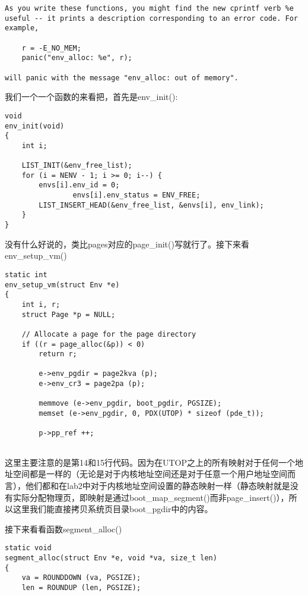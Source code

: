 \documentclass{article}
\newcommand{\funcname}[1]{{\ttfamily \small #1}}
\begin{document}
\begin{CJK*}{UTF8}{gkai}
\begin{lstlisting}[style=exercise]
As you write these functions, you might find the new cprintf verb %e useful -- it prints a description corresponding to an error code. For example,

	r = -E_NO_MEM;
	panic("env_alloc: %e", r);
	
will panic with the message "env_alloc: out of memory".
\end{lstlisting}

\vspace{4em}

我们一个一个函数的来看把，首先是\funcname{env\_init()}:

\begin{lstlisting}[style=ccode, title={\scriptsize \ttfamily \bfseries kern/env.c: env\_init ()}]
void
env_init(void)
{
	int i;

	LIST_INIT(&env_free_list);
	for (i = NENV - 1; i >= 0; i--) {
		envs[i].env_id = 0;
                envs[i].env_status = ENV_FREE; 
		LIST_INSERT_HEAD(&env_free_list, &envs[i], env_link);
	}
}
\end{lstlisting}

没有什么好说的，类比pages对应的\funcname{page\_init()}写就行了。接下来看 \funcname{ env\_setup\_vm() }

\begin{lstlisting}[style=ccode, title={\scriptsize \ttfamily \bfseries kern/env.c: env\_setup\_vm ()}]
static int
env_setup_vm(struct Env *e)
{
	int i, r;
	struct Page *p = NULL;

	// Allocate a page for the page directory
	if ((r = page_alloc(&p)) < 0)
		return r;
		
        e->env_pgdir = page2kva (p);
        e->env_cr3 = page2pa (p);

        memmove (e->env_pgdir, boot_pgdir, PGSIZE);
        memset (e->env_pgdir, 0, PDX(UTOP) * sizeof (pde_t));
   
        p->pp_ref ++;
    
\end{lstlisting}

这里主要注意的是第14和15行代码。因为在UTOP之上的所有映射对于任何一个地址空间都是一样的（无论是对于内核地址空间还是对于任意一个用户地址空间而言），他们都和在lab2中对于内核地址空间设置的静态映射一样（静态映射就是没有实际分配物理页，即映射是通过\funcname{boot\_map\_segment()}而非\funcname{page\_insert()}），所以这里我们能直接拷贝系统页目录boot\_pgdir中的内容。

接下来看看函数\funcname{segment\_alloc()}

\begin{lstlisting}[style=ccode, title={\scriptsize \ttfamily \bfseries kern/env.c: segment\_alloc ()}]
static void
segment_alloc(struct Env *e, void *va, size_t len)
{
    va = ROUNDDOWN (va, PGSIZE);
    len = ROUNDUP (len, PGSIZE);


\end{lstlisting}
\end{CJK*}
\end{document}
